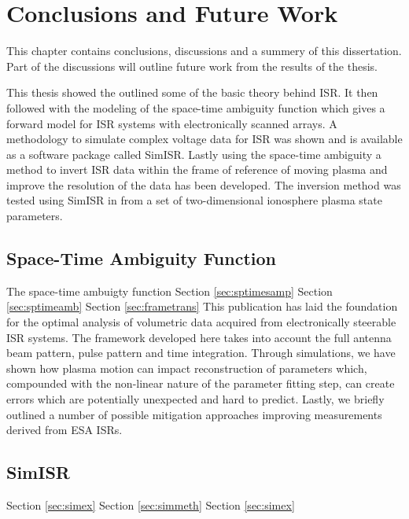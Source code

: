 \chapter{Conclusions and Future Work}
\label{chapter:Conclusions}
\thispagestyle{myheadings}

\graphicspath{{6_Conclusion/Figures/}}
This chapter contains conclusions, discussions and a summery of this dissertation. Part of the discussions will outline future work from the results of the thesis.

This thesis showed the outlined some of the basic theory behind ISR. It then followed with the modeling of the space-time ambiguity function which gives a forward model for ISR systems with electronically scanned arrays. A methodology to simulate complex voltage data for ISR was shown and is available as a software package called SimISR. Lastly using the space-time ambiguity a method to invert ISR data within the frame of reference of moving plasma and improve the resolution of the data has been developed. The inversion method was tested using SimISR in from a set of two-dimensional ionosphere plasma state parameters.

\section{Space-Time Ambiguity Function}
The space-time ambuigty function 
Section \ref{sec:sptimesamp} Section \ref{sec:sptimeamb} Section \ref{sec:frametrans} 
This publication has laid the foundation for the optimal analysis of volumetric data acquired from electronically steerable ISR systems. The framework developed here takes into account the full antenna beam pattern, pulse pattern and time integration. Through simulations, we have shown how plasma motion can impact reconstruction of parameters which, compounded with the non-linear nature of the parameter fitting step, can create errors which are potentially unexpected and hard to predict. Lastly, we briefly outlined a number of possible mitigation approaches improving measurements derived from ESA ISRs.

\section{SimISR}
Section \ref{sec:simex} Section \ref{sec:simmeth} Section \ref{sec:simex}

